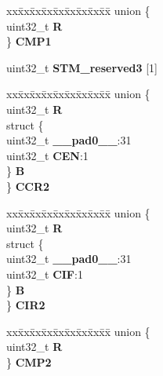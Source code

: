\begin{DoxyCompactItemize}
\begin{tabbing}
\end{tabbing}\item 
\mbox{\label{structSTM__tag_afe3652ece1a1258f8e3c6a32bf6df91e}} 
\begin{tabbing}
xx\=xx\=xx\=xx\=xx\=xx\=xx\=xx\=xx\=\kill
union \{\\
\>uint32\_t {\bfseries R}\\
\} {\bfseries CMP1}\\

\end{tabbing}\item 
\mbox{\label{structSTM__tag_aa9bcd35651c741c7f337fb9c5bd4e23a}} 
uint32\+\_\+t {\bfseries S\+T\+M\+\_\+reserved3} \mbox{[}1\mbox{]}
\item 
\mbox{\label{structSTM__tag_abd9d6e58a0be9b185a6c071af8d07f76}} 
\begin{tabbing}
xx\=xx\=xx\=xx\=xx\=xx\=xx\=xx\=xx\=\kill
union \{\\
\>uint32\_t {\bfseries R}\\
\>struct \{\\
\>\>uint32\_t {\bfseries \_\_pad0\_\_}:31\\
\>\>uint32\_t {\bfseries CEN}:1\\
\>\} {\bfseries B}\\
\} {\bfseries CCR2}\\

\end{tabbing}\item 
\mbox{\label{structSTM__tag_a2731de2cb4c05bd95eded98f30b27380}} 
\begin{tabbing}
xx\=xx\=xx\=xx\=xx\=xx\=xx\=xx\=xx\=\kill
union \{\\
\>uint32\_t {\bfseries R}\\
\>struct \{\\
\>\>uint32\_t {\bfseries \_\_pad0\_\_}:31\\
\>\>uint32\_t {\bfseries CIF}:1\\
\>\} {\bfseries B}\\
\} {\bfseries CIR2}\\

\end{tabbing}\item 
\mbox{\label{structSTM__tag_ae290619a6b7dd56be761daa6635e2787}} 
\begin{tabbing}
xx\=xx\=xx\=xx\=xx\=xx\=xx\=xx\=xx\=\kill
union \{\\
\>uint32\_t {\bfseries R}\\
\} {\bfseries CMP2}\\


\end{tabbing}
\end{DoxyCompactItemize}
